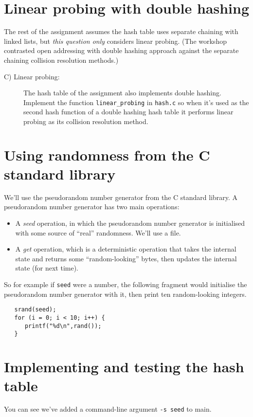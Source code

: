 \documentclass[11pt]{article}
\begin{document}
\section*{Linear probing with double hashing}
The rest of the assignment assumes the hash table uses separate chaining with linked lists, but \emph{this question only} considers linear probing.   (The workshop contrasted open addressing with double hashing approach against the separate chaining collision resolution methods.)

\begin{description}
    \item[C) Linear probing:]
        The hash table of the assignment also implements double hashing.
        Implement the function {\tt linear\_probing} in {\tt hash.c}
        so when it's used as the second hash function of a double hashing hash table it performs linear probing as its collision resolution method.
\end{description}

\section*{Using randomness from the C standard library}
We'll use the pseudorandom number generator from the C standard library.
A pseudorandom number generator has two main operations:
\begin{itemize}
\item A \emph{seed} operation, in which the pseudorandom number generator is
    initialised with some source of ``real'' randomness.  We'll use a file.
\item A \emph{get} operation, which is a deterministic operation that takes the
    internal state and returns some ``random-looking'' bytes, then updates the
        internal state (for next time).
\end{itemize}
So for example if {\tt seed} were a number,
the following fragment would initialise the pseudorandom number generator with it,
then print ten random-looking integers.

\newpage
\begin{verbatim}
   srand(seed);
   for (i = 0; i < 10; i++) {
      printf("%d\n",rand());
   }
\end{verbatim}

\section*{Implementing and testing the hash table}
You can see we've added a command-line argument {\tt -s seed} to main.
\end{document}
